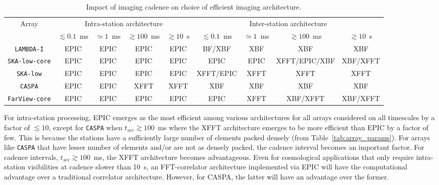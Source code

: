 \documentclass[
  journal=pasa,
  manuscript=article-type,
  year=2020,
  volume=37,
]{cup-journal}
\begin{document}
\begin{table}[htb!]
\normalsize
\begin{threeparttable}
\caption{Impact of imaging cadence on choice of efficient imaging architecture.}
\label{tab:cadence}
\begin{tabular}{c|cccc|cccc}
\toprule
\headrow 
Array & \multicolumn{4}{c|}{Intra-station architecture} & \multicolumn{4}{c}{Inter-station architecture} \\ 
 & $\lesssim 0.1$~ms & $\simeq 1$~ms & $\gtrsim 100$~ms & $\gtrsim 10$~s & $\lesssim 0.1$~ms & $\simeq 1$~ms & $\gtrsim 100$~ms & $\gtrsim 10$~s \\ 
\midrule\midrule

\texttt{LAMBDA-I} & EPIC & EPIC & EPIC & EPIC & BF/XBF & XBF & XBF & XBF \\
\midrule
\texttt{SKA-low-core} & EPIC & EPIC & EPIC & EPIC & EPIC & EPIC & XFFT/EPIC/XBF & XBF/XFFT \\
\midrule
\texttt{SKA-low} & EPIC & EPIC & EPIC & EPIC & XFFT/EPIC & XFFT & XFFT & XFFT \\
\midrule
\texttt{CASPA} & EPIC & EPIC & XFFT & XFFT & XBF & XBF & XBF & XBF \\
\midrule
\texttt{FarView-core} & EPIC & EPIC & EPIC & EPIC & EPIC & XFFT & XBF/XFFT & XBF/XFFT \\
\bottomrule
\end{tabular}
\end{threeparttable}
\end{table}

For intra-station processing, EPIC emerges as the most efficient among various architectures for all arrays considered on all timescales by a factor of $\lesssim 10$, except for \texttt{CASPA} when $t_\textrm{acc}\gtrsim 100$~ms where the XFFT architecture emerges to be more efficient than EPIC by a factor of few. This is because the stations have a sufficiently large number of elements packed densely (from Table~\ref{tab:array_params}). For arrays like \texttt{CASPA} that have lesser number of elements and/or are not as densely packed, the cadence interval becomes an important factor. For cadence intervals, $t_\textrm{acc}\gtrsim 100$~ms, the XFFT architecture becomes advantageous. Even for cosmological applications that only require intra-station visibilities at cadence slower than 10~s, an FFT-correlator architecture implemented via EPIC will have the computational advantage over a traditional correlator architecture. However, for CASPA, the latter will have an advantage over the former.
\end{document}
